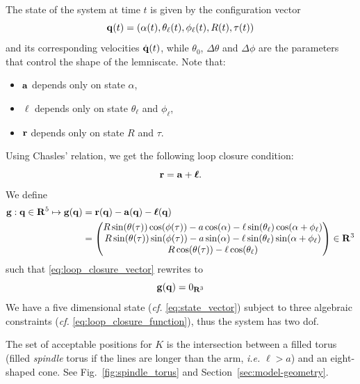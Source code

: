 The state of the system at time $t$ is given by the configuration vector
\begin{equation} \label{eq:state_vector}
    \vb q(t) = (\alpha(t), \theta_\ell(t), \phi_\ell(t), R(t), \tau(t))
\end{equation}
%
and its corresponding velocities $\dot{\vb q}(t)$, while $\theta_0$, $\Delta \theta$ and $\Delta \phi$ are the parameters that control the shape of the lemniscate.
Note that:
\begin{itemize}
    \item $\vb a$ depends only on state $\alpha$,
    \item $\boldsymbol{\ell}$ depends only on state $\theta_\ell$ and $\phi_\ell$,
    \item $\vb r$ depends only on state $R$ and $\tau$.
\end{itemize}
%
Using Chasles' relation, we get the following loop closure condition:
\begin{equation} \label{eq:loop_closure_vector}
    \vb r = \vb a + \boldsymbol{\ell}.
\end{equation}
%
We define
\begin{equation} \label{eq:func_g}
\begin{split}
    \vb g : \vb q \in \mathbf{R}^5 \mapsto
    \vb g(\vb q) &= \vb r(\vb q) - \vb a(\vb q) - \boldsymbol{\ell}(\vb q) \\
    &= \begin{pmatrix}
        R \sin(\theta(\tau)) \cos(\phi(\tau)) - a \cos(\alpha) - \ell \sin(\theta_\ell) \cos(\alpha + \phi_\ell) \\
        R \sin(\theta(\tau)) \sin(\phi(\tau)) - a \sin(\alpha) - \ell \sin(\theta_\ell) \sin(\alpha + \phi_\ell) \\
        R \cos(\theta(\tau)) - \ell \cos(\theta_\ell)
    \end{pmatrix} \in \mathbf{R}^3
\end{split}
\end{equation}
such that \eqref{eq:loop_closure_vector} rewrites to
\begin{equation} \label{eq:loop_closure_function}
    \vb g(\vb q) = 0_{\mathbf{R}^3}
\end{equation}
We have a five dimensional state (\emph{cf.} \eqref{eq:state_vector}) subject to three algebraic constraints (\emph{cf.} \eqref{eq:loop_closure_function}), thus the system has two \ac{dof}.

\begin{remark} 
The set of acceptable positions for $K$ is the intersection between a filled torus (filled \emph{spindle} torus if the lines are longer than the arm, \emph{i.e.} $\ell > a$) and an eight-shaped cone.
See Fig.~\ref{fig:spindle_torus} and Section~\ref{sec:model-geometry}.
\end{remark}

